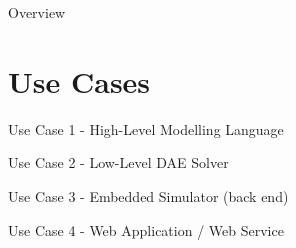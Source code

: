 \documentclass[compress,newPxFont,sthlmFooter]{beamer}
\begin{document}
\begin{frame}{Overview}
\end{frame}

\section{Use Cases} 

\begin{frame}{Use Case 1 - High-Level Modelling Language}
\end{frame}

\begin{frame}{Use Case 2 - Low-Level DAE Solver}
\end{frame}

\begin{frame}{Use Case 3 - Embedded Simulator (back end)}
\end{frame}

\begin{frame}{Use Case 4 - Web Application / Web Service}
\end{frame}
\end{document}
